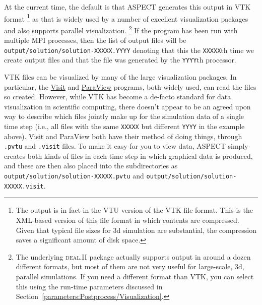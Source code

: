 \documentclass{article}
\newcommand{\dealii}{{\textsc{deal.II}}}
\newcommand{\aspect}{\textsc{ASPECT}}
\begin{document}
\begin{itemize}
  At the current time, the
  default is that \aspect{} generates this output in VTK format%
  \footnote{The output is in fact in the VTU version of the VTK file
    format. This is the XML-based version of this file format in which
    contents are compressed. Given that typical file sizes for 3d simulation
    are substantial, the compression saves a significant amount of disk
    space.}  as that is widely used by a number of excellent visualization
  packages and also supports parallel visualization.%
  \footnote{The underlying \dealii{} package actually supports output in
    around a dozen different formats, but most of them are not very useful for
    large-scale, 3d, parallel simulations. If you need a different format than
    VTK, you can select this using the run-time parameters discussed in
    Section~\ref{parameters:Postprocess/Visualization}.}  If
  the program has been run with multiple MPI processes, then the list of
  output files will be \texttt{output/solution/solution-XXXXX.YYYY}
  denoting that this the \texttt{XXXXX}th time we create output files and that
  the file was generated by the \texttt{YYYY}th processor.

  VTK files can be visualized by many of the large visualization packages. In
  particular, the
  \href{https://visit.llnl.gov}{Visit} and
  \href{http://www.paraview.org/}{ParaView} programs, both
  widely used, can read the files so created. However, while VTK has become a
  de-facto standard for data visualization in scientific computing, there
  doesn't appear to be an agreed upon way to describe which files jointly make
  up for the simulation data of a single time step (i.e., all files with the
  same \texttt{XXXXX} but different \texttt{YYYY} in the example above). Visit
  and ParaView both have their method of doing things, through \texttt{.pvtu} and
  \texttt{.visit} files. To make it easy for you to view data, \aspect{}
  simply creates both kinds of files in each time step in which graphical data
  is produced, and these are then also placed into the subdirectories as
  \texttt{output/solution/solution-XXXXX.pvtu} and
  \texttt{output/solution/solution-XXXXX.visit}.


\end{itemize}
\end{document}
